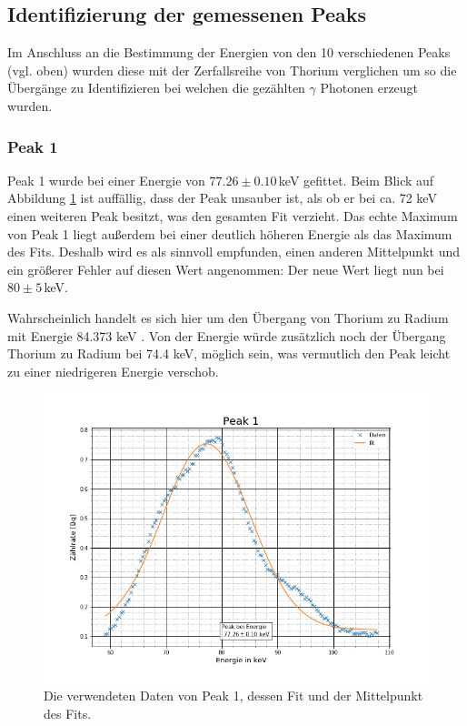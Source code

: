 \subsection{Identifizierung der gemessenen Peaks}
Im Anschluss an die Bestimmung der Energien von den 10 verschiedenen Peaks (vgl. oben) wurden diese mit der Zerfallsreihe von Thorium verglichen um so die Übergänge zu Identifizieren bei welchen die gezählten $\gamma$ Photonen erzeugt wurden.
\subsubsection{Peak 1}
Peak 1 wurde bei einer Energie von $77.26\pm0.10\,$keV gefittet. 
Beim Blick auf Abbildung \ref{p1} ist auffällig, dass der Peak unsauber ist, als ob er bei ca. 72 keV einen weiteren Peak besitzt, was den gesamten Fit verzieht. Das echte Maximum von Peak 1 liegt außerdem bei einer deutlich höheren Energie als das Maximum des Fits. Deshalb wird es als sinnvoll empfunden, einen anderen Mittelpunkt und ein größerer Fehler auf diesen Wert angenommen: Der neue Wert liegt nun bei $80\pm5\,$keV.\par
Wahrscheinlich handelt es sich hier um den Übergang von Thorium zu Radium mit Energie 84.373 keV \cite{Thorium}. Von der Energie würde zusätzlich noch der Übergang Thorium zu Radium bei 74.4 keV, möglich sein, was vermutlich den Peak leicht zu einer niedrigeren Energie verschob.
\begin{figure}[h]
	\centering
	\includegraphics[scale=0.7]{Bilder/Anhang/P1}
	\caption[Thorium Peak 1]{\small Die verwendeten Daten von Peak 1, dessen Fit und der Mittelpunkt des Fits.}
	\label{p1}
\end{figure}
